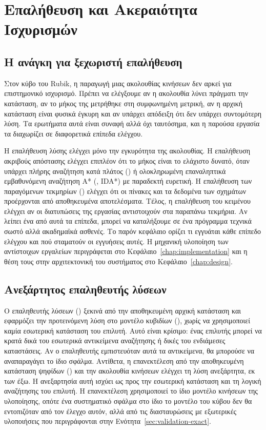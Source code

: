 \chapter{Επαλήθευση και Ακεραιότητα Ισχυρισμών}
\label{chap:validation}

\section{Η ανάγκη για ξεχωριστή επαλήθευση}
\label{sec:validation-scope}
Στον κύβο του Rubik, η παραγωγή μιας ακολουθίας κινήσεων δεν αρκεί για επιστημονικό ισχυρισμό. Πρέπει να ελέγξουμε αν η ακολουθία λύνει πράγματι την κατάσταση, αν το μήκος της μετρήθηκε στη συμφωνημένη μετρική, αν η αρχική κατάσταση είναι φυσικά έγκυρη και αν υπάρχει απόδειξη ότι δεν υπάρχει συντομότερη λύση. Τα ερωτήματα αυτά είναι συναφή αλλά όχι ταυτόσημα, και η παρούσα εργασία τα διαχωρίζει σε διαφορετικά επίπεδα ελέγχου.

Η επαλήθευση λύσης ελέγχει μόνο την εγκυρότητα της ακολουθίας. Η επαλήθευση ακριβούς απόστασης ελέγχει επιπλέον ότι το μήκος είναι το ελάχιστο δυνατό, όταν υπάρχει πλήρης αναζήτηση κατά πλάτος () ή ολοκληρωμένη επαναληπτικά εμβαθυνόμενη αναζήτηση A* (, IDA*) με παραδεκτή ευρετική. Η επαλήθευση των παραγόμενων τεκμηρίων () ελέγχει ότι οι πίνακες και τα δεδομένα των σχημάτων προέρχονται από αποθηκευμένα αποτελέσματα. Τέλος, η επαλήθευση του κειμένου ελέγχει αν οι διατυπώσεις της εργασίας αντιστοιχούν στα παραπάνω τεκμήρια. Αν λείπει ένα από αυτά τα επίπεδα, μπορεί να καταλήξουμε σε ένα πρόγραμμα τεχνικά σωστό αλλά ακαδημαϊκά ασθενές. Το παρόν κεφάλαιο ορίζει τι εγγυάται κάθε επίπεδο ελέγχου και πού σταματούν οι εγγυήσεις αυτές. Η μηχανική υλοποίηση των αντίστοιχων εργαλείων περιγράφεται στο Κεφάλαιο~\ref{chap:implementation} και η θέση τους στην αρχιτεκτονική του συστήματος στο Κεφάλαιο~\ref{chap:design}.

\section{Ανεξάρτητος επαληθευτής λύσεων}
\label{sec:validation-verifier}
Ο επαληθευτής λύσεων () ξεκινά από την αποθηκευμένη αρχική κατάσταση και εφαρμόζει την προτεινόμενη λύση στο μοντέλο κυβιδίων (), χωρίς να χρησιμοποιεί καμία εσωτερική κατάσταση του επιλυτή. Αυτό είναι κρίσιμο: ένας επιλυτής μπορεί να κρατά δικά του εσωτερικά αντικείμενα αναζήτησης ή δικές του ενδιάμεσες καταστάσεις. Αν ο επαληθευτής εμπιστευόταν αυτά τα αντικείμενα, θα μπορούσε να αναπαραγάγει το ίδιο σφάλμα. Αντίθετα, η επανεκτέλεση από την αποθηκευμένη κατάσταση ψηφίδων () και την ακολουθία κινήσεων ελέγχει τη λύση ανεξάρτητα, εκ των έξω. Η ανεξαρτησία αυτή ισχύει ως προς την εσωτερική κατάσταση και τη λογική αναζήτησης του επιλυτή. Η επανεκτέλεση χρησιμοποιεί το ίδιο μοντέλο κινήσεων της υλοποίησης, οπότε ένα συστηματικό σφάλμα στο ίδιο το μοντέλο του κύβου δεν θα εντοπιζόταν από τον έλεγχο αυτόν, αλλά από τις διασταυρώσεις με εξωτερικές υλοποιήσεις που περιγράφονται στην Ενότητα~\ref{sec:validation-exact}.

